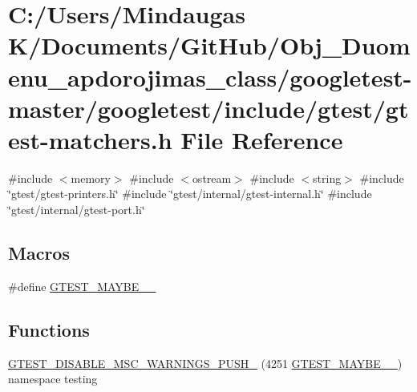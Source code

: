 \hypertarget{googletest-master_2googletest_2include_2gtest_2gtest-matchers_8h}{}\section{C\+:/\+Users/\+Mindaugas K/\+Documents/\+Git\+Hub/\+Obj\+\_\+\+Duomenu\+\_\+apdorojimas\+\_\+class/googletest-\/master/googletest/include/gtest/gtest-\/matchers.h File Reference}
\label{googletest-master_2googletest_2include_2gtest_2gtest-matchers_8h}
{\ttfamily \#include $<$memory$>$}\newline
{\ttfamily \#include $<$ostream$>$}\newline
{\ttfamily \#include $<$string$>$}\newline
{\ttfamily \#include \char`\"{}gtest/gtest-\/printers.\+h\char`\"{}}\newline
{\ttfamily \#include \char`\"{}gtest/internal/gtest-\/internal.\+h\char`\"{}}\newline
{\ttfamily \#include \char`\"{}gtest/internal/gtest-\/port.\+h\char`\"{}}\newline
\subsection*{Macros}
\begin{DoxyCompactItemize}
\item 
\#define \mbox{\hyperlink{googletest-master_2googletest_2include_2gtest_2gtest-matchers_8h_a71fe8dfcd1a8cd227fc47558f26452b9}{G\+T\+E\+S\+T\+\_\+\+M\+A\+Y\+B\+E\+\_\+\_\+}}
\end{DoxyCompactItemize}
\subsection*{Functions}
\begin{DoxyCompactItemize}
\item 
\mbox{\hyperlink{googletest-master_2googletest_2include_2gtest_2gtest-matchers_8h_ae9b7a8d33bcb4bbad774b324eeeb23d6}{G\+T\+E\+S\+T\+\_\+\+D\+I\+S\+A\+B\+L\+E\+\_\+\+M\+S\+C\+\_\+\+W\+A\+R\+N\+I\+N\+G\+S\+\_\+\+P\+U\+S\+H\+\_\+}} (4251 \mbox{\hyperlink{_obj__test_2lib_2googletest-master_2googletest_2include_2gtest_2gtest-matchers_8h_a71fe8dfcd1a8cd227fc47558f26452b9}{G\+T\+E\+S\+T\+\_\+\+M\+A\+Y\+B\+E\+\_\+\_\+}}) namespace testing
\end{DoxyCompactItemize}


